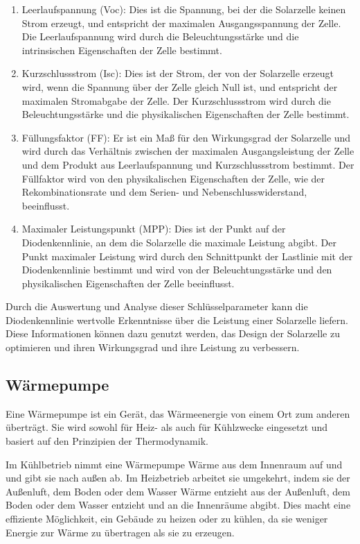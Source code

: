 \documentclass[12pt,english,ngerman]{scrartcl}
\begin{document}
\begin{enumerate}
	\item Leerlaufspannung (Voc): Dies ist die Spannung, bei der die Solarzelle keinen
	      Strom erzeugt, und entspricht der maximalen Ausgangsspannung der Zelle. Die
	      Leerlaufspannung wird durch die Beleuchtungsstärke und die intrinsischen
	      Eigenschaften der Zelle bestimmt.
	\item Kurzschlussstrom (Isc): Dies ist der Strom, der von der Solarzelle erzeugt
	      wird, wenn die Spannung über der Zelle gleich Null ist, und entspricht der
	      maximalen Stromabgabe der Zelle. Der Kurzschlussstrom wird durch die
	      Beleuchtungsstärke und die physikalischen Eigenschaften der Zelle bestimmt.
	\item Füllungsfaktor (FF): Er ist ein Maß für den Wirkungsgrad der Solarzelle und
	      wird durch das Verhältnis zwischen der maximalen Ausgangsleistung der Zelle und
	      dem Produkt aus Leerlaufspannung und Kurzschlussstrom bestimmt. Der Füllfaktor
	      wird von den physikalischen Eigenschaften der Zelle, wie der Rekombinationsrate
	      und dem Serien- und Nebenschlusswiderstand, beeinflusst.
	\item Maximaler Leistungspunkt (MPP): Dies ist der Punkt auf der Diodenkennlinie, an
	      dem die Solarzelle die maximale Leistung abgibt. Der Punkt maximaler Leistung
	      wird durch den Schnittpunkt der Lastlinie mit der Diodenkennlinie bestimmt und
	      wird von der Beleuchtungsstärke und den physikalischen Eigenschaften der Zelle
	      beeinflusst.
\end{enumerate}

Durch die Auswertung und Analyse dieser Schlüsselparameter kann die
Diodenkennlinie wertvolle Erkenntnisse über die Leistung einer Solarzelle
liefern. Diese Informationen können dazu genutzt werden, das Design der
Solarzelle zu optimieren und ihren Wirkungsgrad und ihre Leistung zu
verbessern.

\subsection{Wärmepumpe}
Eine Wärmepumpe ist ein Gerät, das Wärmeenergie von einem Ort zum anderen
überträgt. Sie wird sowohl für Heiz- als auch für Kühlzwecke eingesetzt und
basiert auf den Prinzipien der Thermodynamik.

Im Kühlbetrieb nimmt eine Wärmepumpe Wärme aus dem Innenraum auf und und gibt
sie nach außen ab. Im Heizbetrieb arbeitet sie umgekehrt, indem sie der
Außenluft, dem Boden oder dem Wasser Wärme entzieht aus der Außenluft, dem
Boden oder dem Wasser entzieht und an die Innenräume abgibt. Dies macht eine
effiziente Möglichkeit, ein Gebäude zu heizen oder zu kühlen, da sie weniger
Energie zur Wärme zu übertragen als sie zu erzeugen.
\end{document}
